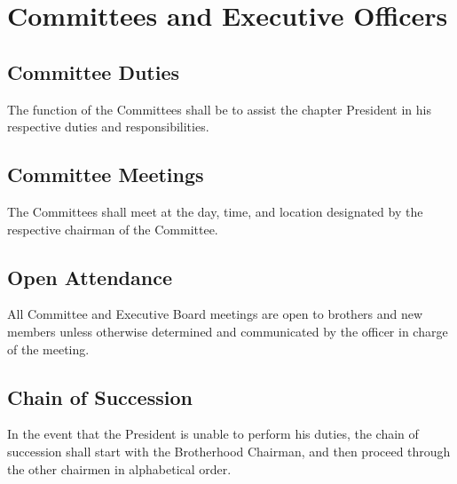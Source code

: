 \chapter{Committees and Executive Officers}
\label{sec:committees-and-executive-officers}

\section{Committee Duties}

The function of the Committees shall be to assist the chapter President in
his respective duties and responsibilities.

\section{Committee Meetings }

The Committees shall meet at the day, time, and location designated by the
respective chairman of the Committee.

\section{Open Attendance}

All Committee and Executive Board meetings are open to brothers and new members
unless otherwise determined and communicated by the officer in charge of the
meeting.

\section{Chain of Succession}

In the event that the President is unable to perform his duties, the
chain of succession shall start with the Brotherhood Chairman, and then proceed
through the other chairmen in alphabetical order. 

